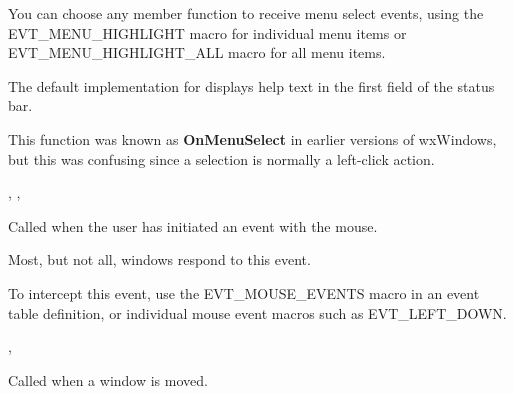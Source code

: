 


You can choose any member function to receive
menu select events, using the EVT\_MENU\_HIGHLIGHT macro for individual menu items or EVT\_MENU\_HIGHLIGHT\_ALL macro
for all menu items.

The default implementation for  displays help
text in the first field of the status bar.

This function was known as {\bf OnMenuSelect} in earlier versions of wxWindows, but this was confusing
since a selection is normally a left-click action.


,\rtfsp
{},\rtfsp
{}


\label{wxwindowonmouseevent}


Called when the user has initiated an event with the
mouse.




Most, but not all, windows respond to this event.

To intercept this event, use the EVT\_MOUSE\_EVENTS macro in an event table definition, or individual
mouse event macros such as EVT\_LEFT\_DOWN.


,\rtfsp
{}

\label{wxwindowonmove}


Called when a window is moved.



